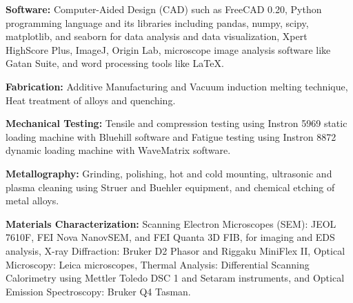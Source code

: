 



\begin{cvparagraph}
    

   

        \textcolor{russell}{\textbf{Software:} Computer-Aided Design (CAD) such as FreeCAD 0.20, Python programming language and its libraries including pandas, numpy, scipy, matplotlib, and seaborn for data analysis and data visualization,  Xpert HighScore Plus, ImageJ, Origin Lab, microscope image analysis software like Gatan Suite, and word processing tools like LaTeX.}
        
        \textcolor{russell}{\textbf{Fabrication:} Additive Manufacturing and Vacuum induction melting technique, Heat treatment of alloys and quenching.}
        
         \textcolor{russell}{\textbf{Mechanical Testing:} Tensile and compression testing using Instron 5969 static loading machine with Bluehill software and Fatigue testing using Instron 8872 dynamic loading machine with WaveMatrix software.}
         
         \textcolor{russell}{\textbf{Metallography:} Grinding, polishing, hot and cold mounting, ultrasonic and plasma cleaning using Struer and Buehler equipment, and chemical etching of metal alloys.}
         
       \textcolor{russell}{\textbf{Materials Characterization:} Scanning Electron Microscopes (SEM): JEOL 7610F, FEI Nova NanovSEM, and FEI Quanta 3D FIB, for imaging and EDS analysis, X-ray Diffraction: Bruker D2 Phasor and Riggaku MiniFlex II, Optical Microscopy: Leica microscopes, Thermal Analysis: Differential Scanning Calorimetry using Mettler Toledo DSC 1 and Setaram instruments, and Optical Emission Spectroscopy: Bruker Q4 Tasman.}
   
    
    
    
    
\end{cvparagraph}
